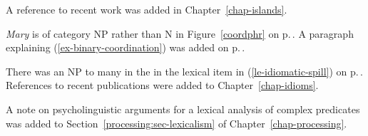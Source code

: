 


A reference to recent work was added in Chapter~\ref{chap-islands}.

\emph{Mary} is of category NP rather than N in Figure~\ref{coordphr} on p.\,\pageref{coordphr}. A
paragraph explaining (\ref{ex-binary-coordination}) was added on p.\,\pageref{ex-binary-coordination}.
%

%



There was an NP to many in the \compsl in the lexical item in (\ref{le-idiomatic-spill}) on
p.\,\pageref{le-idiomatic-spill}. 
References to recent publications were added to Chapter~\ref{chap-idioms}.








A note on psycholinguistic arguments for a lexical analysis of complex predicates was added to
Section~\ref{processing:sec-lexicalism} of Chapter~\ref{chap-processing}. 

%
%









